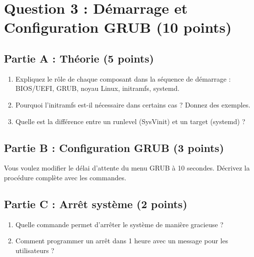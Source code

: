 \documentclass[12pt,a4paper]{article}
\begin{document}
\newpage


\section{Question 3 : Démarrage et Configuration GRUB (10 points)}

\begin{questionbox}
\subsection*{Partie A : Théorie (5 points)}
\begin{enumerate}[label=\alph*)]
    \item Expliquez le rôle de chaque composant dans la séquence de démarrage : BIOS/UEFI, GRUB, noyau Linux, initramfs, systemd.
    \item Pourquoi l'initramfs est-il nécessaire dans certains cas ? Donnez des exemples.
    \item Quelle est la différence entre un runlevel (SysVinit) et un target (systemd) ?
\end{enumerate}

\subsection*{Partie B : Configuration GRUB (3 points)}
Vous voulez modifier le délai d'attente du menu GRUB à 10 secondes. Décrivez la procédure complète avec les commandes.

\subsection*{Partie C : Arrêt système (2 points)}
\begin{enumerate}[label=\alph*)]
    \item Quelle commande permet d'arrêter le système de manière gracieuse ?
    \item Comment programmer un arrêt dans 1 heure avec un message pour les utilisateurs ?
\end{enumerate}
\end{questionbox}

\newpage

\end{document}

